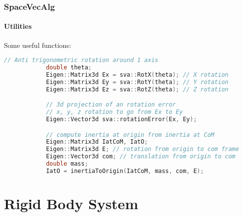 \documentclass{beamer}
\begin{document}
  	\begin{frame}[fragile]
		\frametitle{SpaceVecAlg}
		\framesubtitle{Utilities}
		Some useful functions:
		\begin{lstlisting}[language=C++]
			// Anti trigonometric rotation around 1 axis
			double theta;
			Eigen::Matrix3d Ex = sva::RotX(theta); // X rotation
			Eigen::Matrix3d Ey = sva::RotY(theta); // Y rotation
			Eigen::Matrix3d Ez = sva::RotZ(theta); // Z rotation

			// 3d projection of an rotation error
			// x, y, z rotation to go from Ex to Ey
			Eigen::Vector3d sva::rotationError(Ex, Ey);

			// compute inertia at origin from inertia at CoM
			Eigen::Matrix3d IatCoM, IatO;
			Eigen::Matrix3d E; // rotation from origin to com frame
			Eigen::Vector3d com; // translation from origin to com
			double mass;
			IatO = inertiaToOrigin(IatCoM, mass, com, E);
		\end{lstlisting}
	\end{frame}

	\section{Rigid Body System}
\end{document}
